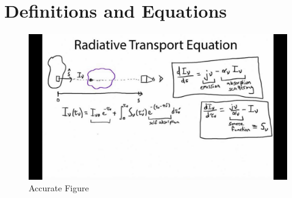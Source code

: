 \section{Definitions and Equations}
\begin{figure}
    \centering
    \includegraphics[scale=0.35]{maxresdefault.jpg}
    \caption{Accurate Figure}
    \label{fig:my_label}
\end{figure}
